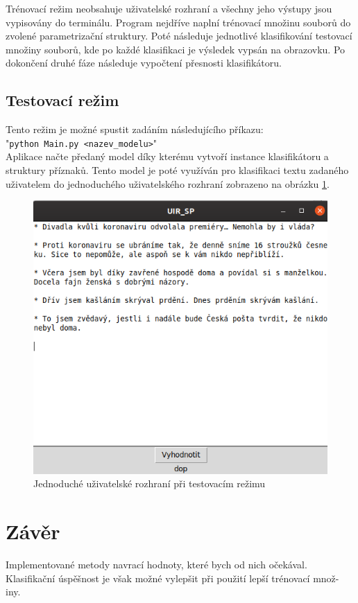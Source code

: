 \documentclass[ 12pt, a4paper]{article}
\begin{document}
Trénovací režim neobsahuje uživatelské rozhraní a všechny jeho výstupy jsou vypisovány do terminálu. Program nejdříve naplní trénovací množinu souborů do zvolené parametrizační struktury. Poté následuje jednotlivé klasifikování testovací množiny souborů, kde po každé klasifikaci je  výsledek vypsán na obrazovku. Po dokončení druhé fáze následuje vypočtení přesnosti klasifikátoru.


\subsection{Testovací režim}
Tento režim je možné spustit zadáním následujícího příkazu:\\
"\texttt{python Main.py <nazev\_modelu>}"\\
Aplikace načte předaný model díky kterému vytvoří instance klasifikátoru a struktury příznaků. Tento model je poté využíván pro klasifikaci textu zadaného uživatelem do jednoduchého uživatelského rozhraní zobrazeno na obrázku \ref{fig:screenshot001}. 

 \begin{figure}
 	\centering
 	\includegraphics[width=0.7\linewidth]{screenshot001}
 	\caption{Jednoduché uživatelské rozhraní při testovacím režimu}
 	\label{fig:screenshot001}
 \end{figure}
 

\newpage
\section{Závěr}
Implementované metody navrací hodnoty, které bych od nich očekával. Klasifikační úspěšnost je však možné vylepšit při použití lepší trénovací množ- iny.
\end{document}
